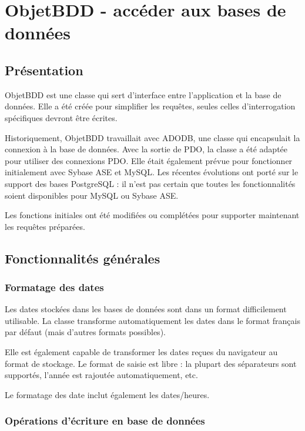 \chapter{ObjetBDD - accéder aux bases de données}\label{objetbdd}

\section{Présentation}

ObjetBDD est une classe qui sert d'interface entre l'application et la base de données. Elle a été créée pour simplifier les requêtes, seules celles d'interrogation spécifiques devront être écrites.

Historiquement, ObjetBDD travaillait avec ADODB, une classe qui encapsulait la connexion à la base de données. Avec la sortie de PDO, la classe a été adaptée pour utiliser des connexions PDO.
Elle était également prévue pour fonctionner initialement avec Sybase ASE et MySQL. Les récentes évolutions ont porté sur le support des bases PostgreSQL : il n'est pas certain que toutes les fonctionnalités soient disponibles pour MySQL ou Sybase ASE.

Les fonctions initiales ont été modifiées ou complétées pour supporter maintenant les requêtes préparées.

\section{Fonctionnalités générales}
\subsection{Formatage des dates}
Les dates stockées dans les bases de données sont dans un format difficilement utilisable. La classe transforme automatiquement les dates dans le format français par défaut (mais d'autres formats possibles). 

Elle est également capable de transformer les dates reçues du navigateur au format de stockage. Le format de saisie est libre : la plupart des séparateurs sont supportés, l'année est rajoutée automatiquement, etc.

Le formatage des date inclut également les dates/heures.

\subsection{Opérations d'écriture en base de données}

